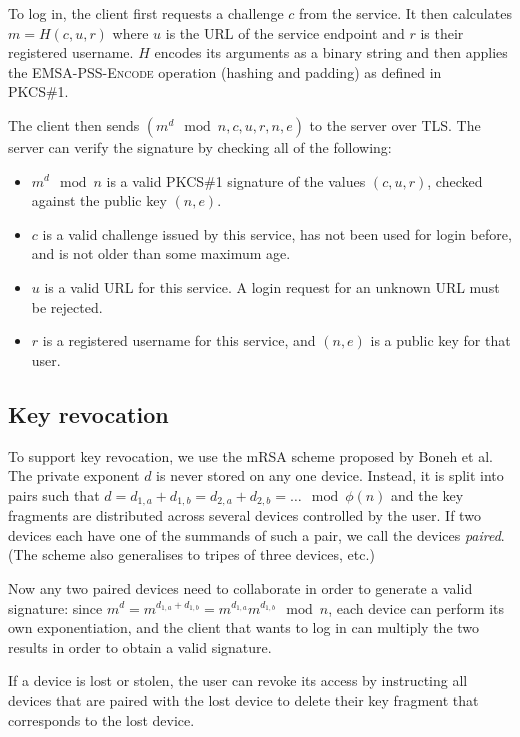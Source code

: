 \documentclass{acm_proc_article-sp}
\begin{document}
To log in, the client first requests a challenge $c$ from the service. It then calculates
$m = H(c, u, r)$ where $u$ is the URL of the service endpoint and $r$ is their registered username.
$H$ encodes its arguments as a binary string and then applies the \textsc{EMSA-PSS-Encode} operation
(hashing and padding) as defined in PKCS\#1.~\cite{PKCS1}

The client then sends $(m^d \mod n, c, u, r, n, e)$ to the server over TLS. The server can verify
the signature by checking all of the following:

\begin{itemize}
\item $m^d \mod n$ is a valid PKCS\#1 signature of the values $(c, u, r)$, checked against the
public key $(n, e)$.
\item $c$ is a valid challenge issued by this service, has not been used for login before, and is
not older than some maximum age.
\item $u$ is a valid URL for this service. A login request for an unknown URL must be rejected.
\item $r$ is a registered username for this service, and $(n, e)$ is a public key for that user.
\end{itemize}

\subsection{Key revocation}

To support key revocation, we use the mRSA scheme proposed by Boneh et al.~\cite{Boneh01} The
private exponent $d$ is never stored on any one device. Instead, it is split into pairs such that
$d = d_{1,a} + d_{1,b} = d_{2,a} + d_{2,b} = \dots \mod \phi(n)$ and the key fragments are
distributed across several devices controlled by the user. If two devices each have one of the
summands of such a pair, we call the devices \emph{paired}. (The scheme also generalises to tripes
of three devices, etc.)

Now any two paired devices need to collaborate in order to generate a valid signature: since
$m^d = m^{d_{1,a} + d_{1,b}} = m^{d_{1,a}} m^{d_{1,b}} \mod n$, each device can perform its own
exponentiation, and the client that wants to log in can multiply the two results in order to obtain
a valid signature.

If a device is lost or stolen, the user can revoke its access by instructing all devices that are
paired with the lost device to delete their key fragment that corresponds to the lost device.
\end{document}
